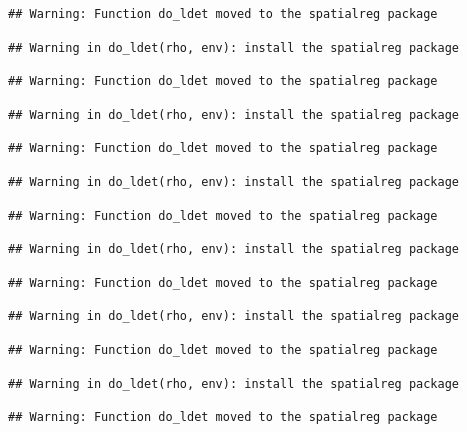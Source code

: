 \documentclass[]{book}
\begin{document}
\begin{verbatim}
## Warning: Function do_ldet moved to the spatialreg package
\end{verbatim}

\begin{verbatim}
## Warning in do_ldet(rho, env): install the spatialreg package
\end{verbatim}

\begin{verbatim}
## Warning: Function do_ldet moved to the spatialreg package
\end{verbatim}

\begin{verbatim}
## Warning in do_ldet(rho, env): install the spatialreg package
\end{verbatim}

\begin{verbatim}
## Warning: Function do_ldet moved to the spatialreg package
\end{verbatim}

\begin{verbatim}
## Warning in do_ldet(rho, env): install the spatialreg package
\end{verbatim}

\begin{verbatim}
## Warning: Function do_ldet moved to the spatialreg package
\end{verbatim}

\begin{verbatim}
## Warning in do_ldet(rho, env): install the spatialreg package
\end{verbatim}

\begin{verbatim}
## Warning: Function do_ldet moved to the spatialreg package
\end{verbatim}

\begin{verbatim}
## Warning in do_ldet(rho, env): install the spatialreg package
\end{verbatim}

\begin{verbatim}
## Warning: Function do_ldet moved to the spatialreg package
\end{verbatim}

\begin{verbatim}
## Warning in do_ldet(rho, env): install the spatialreg package
\end{verbatim}

\begin{verbatim}
## Warning: Function do_ldet moved to the spatialreg package
\end{verbatim}
\end{document}
